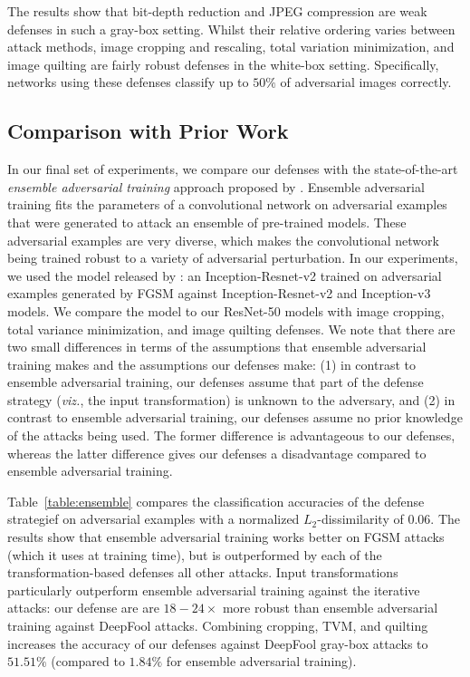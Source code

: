 The results show that bit-depth reduction and JPEG compression are weak defenses in such a gray-box setting. Whilst their relative ordering varies between attack methods, image cropping and rescaling, total variation minimization, and image quilting are fairly robust defenses in the white-box setting. Specifically, networks using these defenses classify up to $50\%$ of adversarial images correctly. 

\subsection{Comparison with Prior Work}
\label{results_part5}

In our final set of experiments, we compare our defenses with the state-of-the-art \emph{ensemble adversarial training} approach proposed by \citet{tramer2017ensemble}. Ensemble adversarial training fits the parameters of a convolutional network on adversarial examples that were generated to attack an ensemble of pre-trained models. These adversarial examples are very diverse, which makes the convolutional network being trained robust to a variety of adversarial perturbation. In our experiments, we used the model released by \citet{tramer2017ensemble}: an Inception-Resnet-v2 \citep{szegedy2016rethinking} trained on adversarial examples generated by FGSM against Inception-Resnet-v2 and Inception-v3 models. We compare the model to our ResNet-50 models with image cropping, total variance minimization, and image quilting defenses. We note that there are two small differences in terms of the assumptions that ensemble adversarial training makes and the assumptions our defenses make: (1) in contrast to ensemble adversarial training, our defenses assume that part of the defense strategy (\emph{viz.}, the input transformation) is unknown to the adversary, and (2) in contrast to ensemble adversarial training, our defenses assume no prior knowledge of the attacks being used. The former difference is advantageous to our defenses, whereas the latter difference gives our defenses a disadvantage compared to ensemble adversarial training.

Table~\ref{table:ensemble} compares the classification accuracies of the defense strategief on adversarial examples with a normalized $L_2$-dissimilarity of $0.06$. The results show that ensemble adversarial training works better on FGSM attacks (which it uses at training time), but is outperformed by each of the transformation-based defenses all other attacks. Input transformations particularly outperform ensemble adversarial training against the iterative attacks: our defense are are $18 \!-\! 24 \times$ more robust than ensemble adversarial training against DeepFool attacks. Combining cropping, TVM, and quilting increases the accuracy of our defenses against DeepFool gray-box attacks to $51.51\%$ (compared to $1.84\%$ for ensemble adversarial training).

